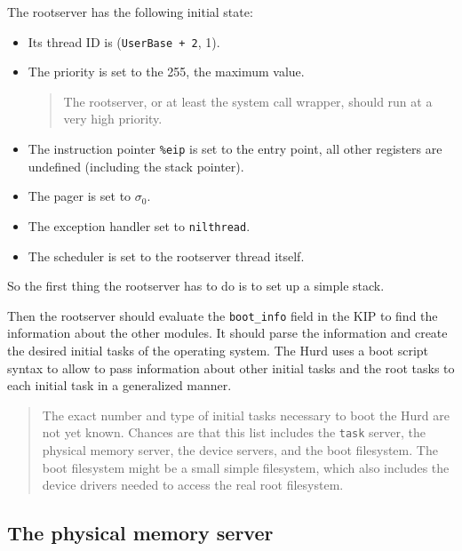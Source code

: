 \documentclass[9pt,a4paper]{extarticle}
\newenvironment{comment}{\footnotesize \begin{quote}}{\end{quote}}
\begin{document}
The rootserver has the following initial state:

\begin{itemize}
\item Its thread ID is (\verb/UserBase + 2/, 1).

\item The priority is set to the 255, the maximum value.

  \begin{comment}
    The rootserver, or at least the system call wrapper, should run at
    a very high priority.
  \end{comment}

\item The instruction pointer \verb/%eip/ is set to the entry point,
all other registers are undefined (including the stack pointer).

\item The pager is set to $\sigma_0$.
  
\item The exception handler set to \verb/nilthread/.
  
\item The scheduler is set to the rootserver thread itself.
\end{itemize}

So the first thing the rootserver has to do is to set up a simple
stack.

Then the rootserver should evaluate the \verb/boot_info/ field in the
KIP to find the information about the other modules.  It should parse
the information and create the desired initial tasks of the operating
system.  The Hurd uses a boot script syntax to allow to pass
information about other initial tasks and the root tasks to each
initial task in a generalized manner.

\begin{comment}
  The exact number and type of initial tasks necessary to boot the
  Hurd are not yet known.  Chances are that this list includes the
  \texttt{task} server, the physical memory server, the device
  servers, and the boot filesystem.  The boot filesystem might be a
  small simple filesystem, which also includes the device drivers
  needed to access the real root filesystem.
\end{comment}


\subsection{The physical memory server}
\end{document}

